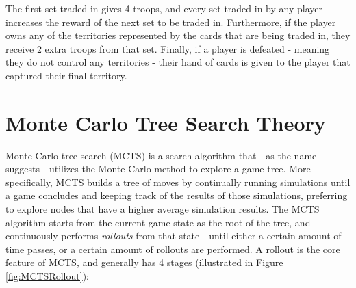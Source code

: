 The first set traded in gives 4 troops, and every set traded in by any player increases the reward of the next set to be traded in. Furthermore, if the player owns any of the territories represented by the cards that are being traded in, they receive 2 extra troops from that set. Finally, if a player is defeated - meaning they do not control any territories - their hand of cards is given to the player that captured their final territory.

\section{Monte Carlo Tree Search Theory}
\label{MCTSTheory}

Monte Carlo tree search (MCTS) \cite{Coulom2007MonteCarlo} is a search algorithm that - as the name suggests - utilizes the Monte Carlo method to explore a game tree. More specifically, MCTS builds a tree of moves by continually running simulations until a game concludes and keeping track of the results of those simulations, preferring to explore nodes that have a higher average simulation results. The MCTS algorithm starts from the current game state as the root of the tree, and continuously performs \textit{rollouts} from that state - until either a certain amount of time passes, or a certain amount of rollouts are performed. A rollout is the core feature of MCTS, and generally has 4 stages (illustrated in Figure \ref{fig:MCTSRollout}):
